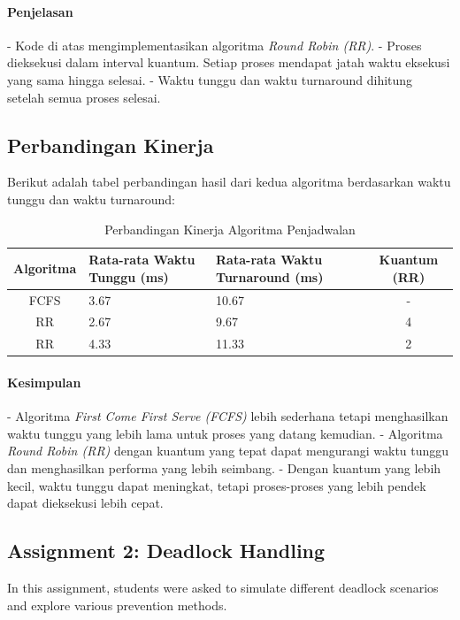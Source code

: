 \documentclass[12pt]{article}
\begin{document}
\paragraph{Penjelasan}
- Kode di atas mengimplementasikan algoritma \textit{Round Robin (RR)}.
- Proses dieksekusi dalam interval kuantum. Setiap proses mendapat jatah waktu eksekusi yang sama hingga selesai.
- Waktu tunggu dan waktu turnaround dihitung setelah semua proses selesai.

\subsection*{Perbandingan Kinerja}

Berikut adalah tabel perbandingan hasil dari kedua algoritma berdasarkan waktu tunggu dan waktu turnaround:

\begin{table}[htbp]
    \centering
    \begin{tabular}{|c|p{3cm}|p{3cm}|c|}
    \hline
    \textbf{Algoritma} & \textbf{Rata-rata Waktu Tunggu (ms)} & \textbf{Rata-rata Waktu Turnaround (ms)} & \textbf{Kuantum (RR)} \\
    \hline
    FCFS & 3.67 & 10.67 & - \\
    \hline
    RR & 2.67 & 9.67 & 4 \\
    \hline
    RR & 4.33 & 11.33 & 2 \\
    \hline
    \end{tabular}
    \caption{Perbandingan Kinerja Algoritma Penjadwalan}
    \label{tab:comparison}
\end{table}
\paragraph{Kesimpulan}
- Algoritma \textit{First Come First Serve (FCFS)} lebih sederhana tetapi menghasilkan waktu tunggu yang lebih lama untuk proses yang datang kemudian.
- Algoritma \textit{Round Robin (RR)} dengan kuantum yang tepat dapat mengurangi waktu tunggu dan menghasilkan performa yang lebih seimbang.
- Dengan kuantum yang lebih kecil, waktu tunggu dapat meningkat, tetapi proses-proses yang lebih pendek dapat dieksekusi lebih cepat.


\subsection{Assignment 2: Deadlock Handling}
In this assignment, students were asked to simulate different deadlock scenarios and explore various prevention methods.
\end{document}
